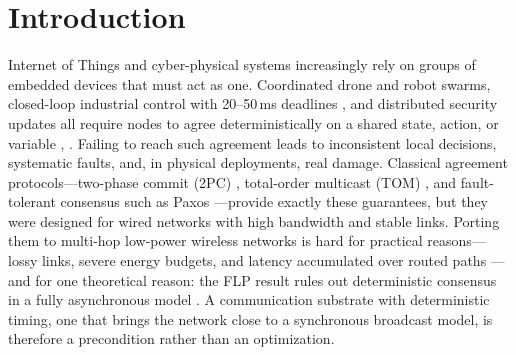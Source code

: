 \documentclass[journal]{IEEEtran}
\begin{document}
\IEEEpeerreviewmaketitle


\section{Introduction}

 Internet of Things and cyber-physical systems
increasingly rely on groups of embedded devices that must act as one.
Coordinated drone and robot swarms, closed-loop industrial control with
20--50\,ms deadlines \cite{mager19feedback}, and distributed security
updates all require nodes to agree deterministically on a shared state,
action, or variable \cite{alnahas17a2}, \cite{wu25dag}. Failing to reach
such agreement
leads to inconsistent local decisions, systematic faults, and, in physical
deployments, real damage. Classical agreement protocols---two-phase commit
(2PC) \cite{gray78notes}, total-order multicast (TOM)
\cite{defago04total}, and fault-tolerant consensus such as Paxos
\cite{lamport98parttime}---provide exactly these guarantees, but they were
designed for wired networks with high bandwidth and stable links. Porting
them to multi-hop low-power wireless networks is hard for practical
reasons---lossy links, severe energy budgets, and latency accumulated over
routed paths \cite{alnahas17a2}---and for one theoretical reason: the FLP
result rules out deterministic consensus in a fully asynchronous model
\cite{flp85}. A communication substrate with deterministic timing, one that
brings the network close to a synchronous broadcast model, is therefore a
precondition rather than an optimization.
\end{document}
